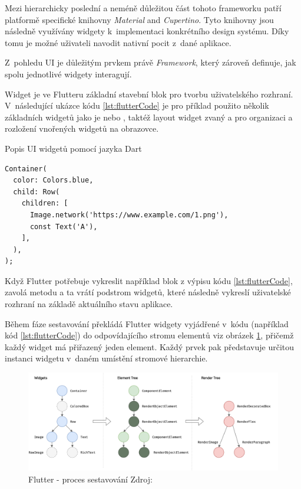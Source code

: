 Mezi hierarchicky poslední a neméně důležitou část tohoto frameworku patří platformě specifické knihovny \textit{Material} and \textit{Cupertino}. Tyto knihovny
jsou následně využívány widgety k~implementaci konkrétního design systému. Díky tomu je možné uživateli navodit nativní pocit z~dané aplikace.

\medskip

Z~pohledu UI je důležitým prvkem právě \textit{Framework}, který zároveň definuje, jak spolu jednotlivé widgety interagují.

Widget je ve Flutteru základní stavební blok pro tvorbu uživatelského rozhraní. \cite{flutterWidgets} V~následující ukázce kódu \ref{lst:flutterCode} je pro příklad použito několik 
základních widgetů jako je  nebo , taktéž layout widget zvaný  a  pro organizaci a 
rozložení vnořených widgetů na obrazovce.

\begin{listing}[H]
\caption{Popis UI widgetů pomocí jazyka Dart}\label{lst:flutterCode}
\begin{verbatim}
Container(
  color: Colors.blue,
  child: Row(
    children: [
      Image.network('https://www.example.com/1.png'),
      const Text('A'),
    ],
  ),
);
\end{verbatim}
\end{listing}

\newpage
Když Flutter potřebuje vykreslit například blok z výpisu kódu \ref{lst:flutterCode}, zavolá metodu  a ta vrátí podstrom widgetů, které následně vykreslí uživatelské 
rozhraní na základě aktuálního stavu aplikace. \cite*{flutterArchOverview}

Během fáze sestavování překládá Flutter widgety vyjádřené v~kódu (například kód \ref{lst:flutterCode}) do odpovídajícího stromu elementů viz obrázek \ref{fig:flutter_trees}, přičemž každý widget má přiřazený jeden element. Každý prvek pak představuje určitou instanci widgetu v~daném umístění stromové hierarchie. \cite*{flutterArchOverview}


\begin{figure}[H]
  \centering
  \includegraphics[width=1\textwidth]{flutter_trees.png}
  \caption{Flutter - proces sestavování Zdroj: \cite{flutterArchOverview}}
  \label{fig:flutter_trees}
\end{figure}


